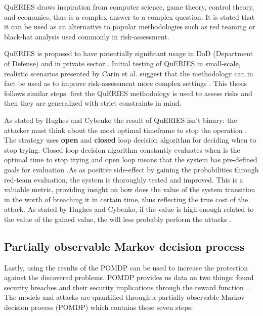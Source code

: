QuERIES draws inspiration from computer science, game theory, control
theory, and economics, thus is a complex answer to a complex
question. It is stated that it can be used as an alternative to
popular methodologies such as red teaming or black-hat analysis used
commonly in risk-assessment. \cite{carin2008cybersecurity}

QuERIES is proposed to have potentially significant usage in DoD
(Department of Defense) and in private sector
\cite{carin2008cybersecurity}. Initial testing of QuERIES in
small-scale, realistic scenarios presented by Carin et al. suggest
that the methodology can in fact be used as to improve risk-assessment
more complex settings \cite{carin2008cybersecurity}. This thesis
follows similar steps: first the QuERIES methodology is used to assess
risks and then they are generalized with strict constraints in mind.

As stated by Hughes and Cybenko the result of QuERIES isn't binary:
the attacker must think about the most optimal timeframe to stop the
operation \cite{hughes2013quantitative}. The strategy uses
\textbf{open} and \textbf{closed} loop decision algorithm for deciding
when to stop trying. Closed loop decision algorithm constantly
evaluates when is the optimal time to stop trying and open loop means
that the system has pre-defined goals for evaluation
\cite{carin2008cybersecurity}.As as positive side-effect by gaining
the probabilities through red-team evaluation, the system is
thoroughly tested and improved. This is a valuable metric, providing
insight on how does the value of the system transition in the worth of
breaching it in certain time, thus reflecting the true cost of the
attack. As stated by Hughes and Cybenko, if the value is high enough
related to the value of the gained value, the will less probably
perform the attacks \cite{hughes2013quantitative}.

\subsection{Partially observable Markov decision process}

Lastly, using the results of the POMDP can be used to increase the
protection against the discovered problems. POMDP provides us data on
two things: found security breaches and their security implications
through the reward function \cite{carin2008cybersecurity}.  The models
and attacks are quantified through a partially observable Markov
decision process (POMDP) which contains these seven steps:

